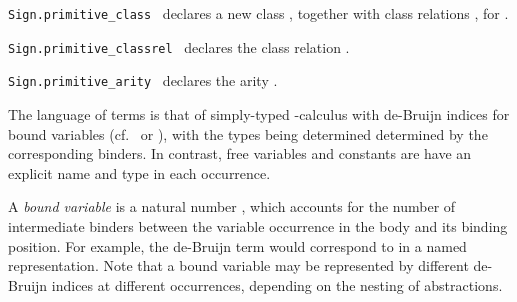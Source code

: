 \begin{isabellebody}
\begin{isamarkuptext}
\begin{description}
  \item \verb|Sign.primitive_class|~ declares a new class , together with class
  relations , for .

  \item \verb|Sign.primitive_classrel|~ declares the class relation .

  \item \verb|Sign.primitive_arity|~ declares
  the arity .

  \end{description}%
\end{isamarkuptext}%
\isamarkuptrue%
%
\endisatagmlref
{\isafoldmlref}%
%
\isadelimmlref
%
\endisadelimmlref
%
\isamarkuptrue%
%
\begin{isamarkuptext}%

  The language of terms is that of simply-typed \isa{{\isasymlambda}}-calculus
  with de-Bruijn indices for bound variables (cf.\ \cite{debruijn72}
  or \cite{paulson-ml2}), with the types being determined determined
  by the corresponding binders.  In contrast, free variables and
  constants are have an explicit name and type in each occurrence.

  \medskip A \emph{bound variable} is a natural number ,
  which accounts for the number of intermediate binders between the
  variable occurrence in the body and its binding position.  For
  example, the de-Bruijn term  would
  correspond to  in a named
  representation.  Note that a bound variable may be represented by
  different de-Bruijn indices at different occurrences, depending on
  the nesting of abstractions.


\end{isamarkuptext}
\end{isabellebody}
